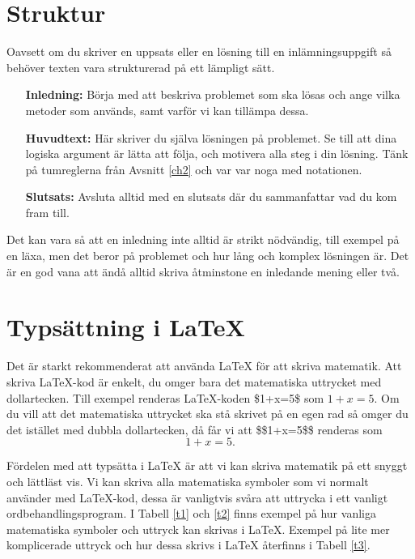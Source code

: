 \documentclass[titlepage]{article}
\begin{document}

\section{Struktur}

Oavsett om du skriver en uppsats eller en lösning till en inlämningsuppgift så behöver texten vara strukturerad på ett lämpligt sätt.

\begin{itemize}[leftmargin=25mm, rightmargin=0mm]
    \item[\textbf{Inledning:}] Börja med att beskriva problemet som ska lösas och ange vilka metoder som används, samt varför vi kan tillämpa dessa.
    \item[\textbf{Huvudtext:}] Här skriver du själva lösningen på problemet. Se till att dina logiska argument är lätta att följa, och motivera alla steg i din lösning. Tänk på tumreglerna från Avsnitt \ref{ch2} och var var noga med notationen.
    \item[\textbf{Slutsats:}] Avsluta alltid med en slutsats där du sammanfattar vad du kom fram till.
\end{itemize}

Det kan vara så att en inledning inte alltid är strikt nödvändig, till exempel på en läxa, men det beror på problemet och hur lång och komplex lösningen är. Det är en god vana att ändå alltid skriva åtminstone en inledande mening eller två.






\section{Typsättning i \LaTeX}

Det är starkt rekommenderat att använda \LaTeX $ $ för att skriva matematik. Att skriva \LaTeX-kod är enkelt, du omger bara det matematiska uttrycket med dollartecken. Till exempel renderas \LaTeX-koden \$1+x=5\$ som $1+x=5$. Om du vill att det matematiska uttrycket ska stå skrivet på en egen rad så omger du det istället med dubbla dollartecken, då får vi att \$\$1+x=5\$\$ renderas som $$1+x=5.$$

Fördelen med att typsätta i \LaTeX$ $ är att vi kan skriva matematik på ett snyggt och lättläst vis. Vi kan skriva alla matematiska symboler som vi normalt använder med \LaTeX-kod, dessa är vanligtvis svåra att uttrycka i ett vanligt ordbehandlingsprogram. I Tabell \ref{t1} och \ref{t2} finns exempel på hur vanliga matematiska symboler och uttryck kan skrivas i \LaTeX. Exempel på lite mer komplicerade uttryck och hur dessa skrivs i \LaTeX$ $ återfinns i Tabell \ref{t3}.
\end{document}
